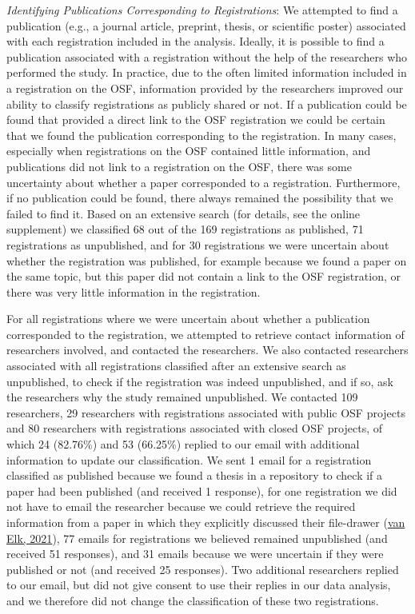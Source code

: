 \documentclass[
  ,jou, a4paper,floatsintext]{apa6}
\begin{document}
\emph{Identifying Publications Corresponding to Registrations}: We attempted to find a publication (e.g., a journal article, preprint, thesis, or scientific poster) associated with each registration included in the analysis. Ideally, it is possible to find a publication associated with a registration without the help of the researchers who performed the study. In practice, due to the often limited information included in a registration on the OSF, information provided by the researchers improved our ability to classify registrations as publicly shared or not. If a publication could be found that provided a direct link to the OSF registration we could be certain that we found the publication corresponding to the registration. In many cases, especially when registrations on the OSF contained little information, and publications did not link to a registration on the OSF, there was some uncertainty about whether a paper corresponded to a registration. Furthermore, if no publication could be found, there always remained the possibility that we failed to find it. Based on an extensive search (for details, see the online supplement) we classified 68 out of the 169 registrations as published, 71 registrations as unpublished, and for 30 registrations we were uncertain about whether the registration was published, for example because we found a paper on the same topic, but this paper did not contain a link to the OSF registration, or there was very little information in the registration.

For all registrations where we were uncertain about whether a publication corresponded to the registration, we attempted to retrieve contact information of researchers involved, and contacted the researchers. We also contacted researchers associated with all registrations classified after an extensive search as unpublished, to check if the registration was indeed unpublished, and if so, ask the researchers why the study remained unpublished. We contacted 109 researchers, 29 researchers with registrations associated with public OSF projects and 80 researchers with registrations associated with closed OSF projects, of which 24 (82.76\%) and 53 (66.25\%) replied to our email with additional information to update our classification. We sent 1 email for a registration classified as published because we found a thesis in a repository to check if a paper had been published (and received 1 response), for one registration we did not have to email the researcher because we could retrieve the required information from a paper in which they explicitly discussed their file-drawer (\protect\hyperlink{ref-van_elk_whats_2021}{van Elk, 2021}), 77 emails for registrations we believed remained unpublished (and received 51 responses), and 31 emails because we were uncertain if they were published or not (and received 25 responses). Two additional researchers replied to our email, but did not give consent to use their replies in our data analysis, and we therefore did not change the classification of these two registrations.
\end{document}
